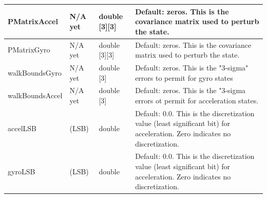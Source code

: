 \begin{table}[H]
\begin{tabular}{ | m{3cm}| m{3cm} | m{3cm} | m{6cm} |}
		PMatrixAccel & N/A yet & double [3][3] & Default: zeros. This is the covariance matrix used to perturb the state. \\ \hline
		PMatrixGyro & N/A yet & double [3][3] & Default: zeros. This is the covariance matrix used to perturb the state. \\ \hline
		walkBoundsGyro & N/A yet& double [3] & Default: zeros. This is the "3-sigma" errors to permit for gyro states \\ \hline
		walkBoundsAccel & N/A yet & double [3] & Default: zeros. This is the "3-sigma errors ot permit for acceleration states. \\ \hline
		accelLSB & (LSB) & double & Default: 0.0. This is the discretization value (least significant bit) for acceleration. Zero indicates no discretization. \\ \hline
		gyroLSB & (LSB)  & double & Default: 0.0. This is the discretization value (least significant bit) for acceleration. Zero indicates no discretization. \\ \hline
	\end{tabular}
	\label{tabular:vars}
\end{table}
